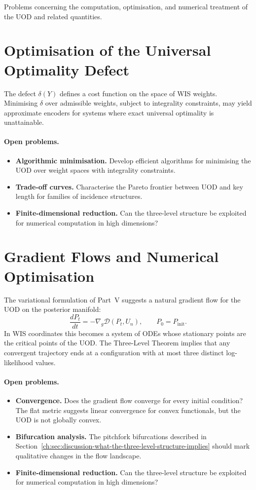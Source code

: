 Problems concerning the computation, optimisation, and numerical
treatment of the UOD and related quantities.

\section{Optimisation of the Universal Optimality Defect}\label{ch:sec:open-optimisation-uod}

The defect $\delta(Y)$ defines a cost function on the space of WIS
weights.  Minimising $\delta$ over admissible weights, subject to
integrality constraints, may yield approximate encoders for systems
where exact universal optimality is unattainable.

\paragraph{Open problems.}
\begin{itemize}
\item \textbf{Algorithmic minimisation.}  Develop efficient algorithms
for minimising the UOD over weight spaces with integrality constraints.
\item \textbf{Trade-off curves.}  Characterise the Pareto frontier
between UOD and key length for families of incidence structures.
\item \textbf{Finite-dimensional reduction.}  Can the three-level
structure be exploited for numerical computation in high dimensions?
\end{itemize}

\section{Gradient Flows and Numerical Optimisation}\label{ch:sec:open-gradient-flows}

The variational formulation of Part~V suggests a natural gradient flow
for the UOD on the posterior manifold:
\[
\frac{dP_t}{dt} = -\nabla_g \mathcal D(P_t, U_n), \qquad
P_0 = P_{\mathrm{init}}.
\]
In WIS coordinates this becomes a system of ODEs whose stationary
points are the critical points of the UOD.  The Three-Level Theorem
implies that any convergent trajectory ends at a configuration with at
most three distinct log-likelihood values.

\paragraph{Open problems.}
\begin{itemize}
\item \textbf{Convergence.}  Does the gradient flow converge for every
initial condition?  The flat metric suggests linear convergence for
convex functionals, but the UOD is not globally convex.
\item \textbf{Bifurcation analysis.}  The pitchfork bifurcations
described in Section~\ref{ch:sec:discussion-what-the-three-level-structure-implies}
should mark qualitative changes in the
flow landscape.
\item \textbf{Finite-dimensional reduction.}  Can the three-level
structure be exploited for numerical computation in high dimensions?
\end{itemize}

